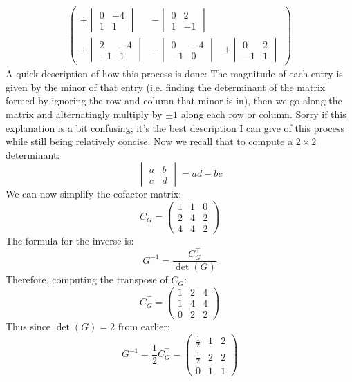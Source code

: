 \documentclass[10pt]{article}
\begin{document}
\begin{enumerate}[label=\alph*)]
\begin{solution}
\begin{align*}
\begin{pmatrix}
					+\begin{vmatrix} 0 & -4 \\ 1 & 1\end{vmatrix} & 
					-\begin{vmatrix} 0 & 2 \\ 1& -1\end{vmatrix}\\
					+\begin{vmatrix} 2& -4\\-1& 1\end{vmatrix} &
					-\begin{vmatrix} 0 & -4 \\ -1 & 0\end{vmatrix}&
					+\begin{vmatrix} 0 & 2\\-1 & 1\end{vmatrix}  \end{pmatrix} 
				\end{align*}
				A quick description of how this process is done: 
				The magnitude of each entry is given by the minor of that entry (i.e. finding the determinant of
				the matrix formed by ignoring the row and column that minor is in), then we go along the matrix
				and alternatingly multiply by $\pm 1$ along each row or column. Sorry if this explanation is 
				a bit confusing; it's the best description I can give of this process while still being 
				relatively concise. Now we recall that to compute a $2 \times 2$ determinant:
				\[
					\begin{vmatrix} a & b\\ c& d\end{vmatrix} = ad - bc
				\] 
				We can now simplify the cofactor matrix:
				\[
					C_G = \begin{pmatrix} 1 & 1 & 0\\ 2 & 4 & 2\\ 4& 4& 2 \end{pmatrix} 
				\] 
				The formula for the inverse is:
				\[
					G^{-1} = \frac{C_G^\top}{\det(G)}
				\] 
				Therefore, computing the transpose of $C_G$:
				\[
					C_G^\top = \begin{pmatrix} 1 & 2 & 4\\1 & 4 & 4\\0&2&2 \end{pmatrix} 
				\] 
				Thus since $\det(G) = 2$ from earlier:
				\[
					G^{-1} = \frac{1}{2}C_G^\top = \begin{pmatrix} \frac{1}{2} & 1 & 2\\ \frac{1}{2}&2 & 2\\0 & 1 & 1 \end{pmatrix} 
\]
\end{solution}
\end{enumerate}
\end{document}
